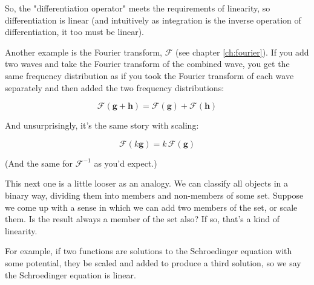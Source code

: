 So, the "differentiation operator" meets the requirements of linearity, so differentiation is linear (and intuitively as integration is the inverse operation of differentiation, it too must be linear).

Another example is the Fourier transform, $\mathcal{F}$ (see chapter \ref{ch:fourier}). If you add two waves and take the Fourier transform of the combined wave, you get the same frequency distribution as if you took the Fourier transform of each wave separately and then added the two frequency distributions:

$$\mathcal{F} (\mathbf{g} + \mathbf{h}) = \mathcal{F} (\mathbf{g}) + \mathcal{F} (\mathbf{h})$$

And unsurprisingly, it's the same story with scaling:

$$\mathcal{F} (k \mathbf{g}) = k \, \mathcal{F} (\mathbf{g})$$

(And the same for $\mathcal{F}^{-1}$ as you'd expect.)

This next one is a little looser as an analogy. We can classify all objects in a binary way, dividing them into members and non-members of some set. Suppose we come up with a sense in which we can add two members of the set, or scale them. Is the result always a member of the set also? If so, that's a kind of linearity.

For example, if two functions are solutions to the Schroedinger equation with some potential, they be scaled and added to produce a third solution, so we say the Schroedinger equation is linear.
